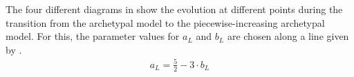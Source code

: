 The four different diagrams in  show the evolution at different points during the transition from the archetypal model to the piecewise-increasing archetypal model.
For this, the parameter values for $a_L$ and $b_L$ are chosen along a line given by .
\begin{align}
	a_L = \frac{5}{2} - 3 \cdot b_L
	\label{equ:add.change.paramline}
\end{align}

\begin{figure}
	\centering
	 \\
\end{figure}
